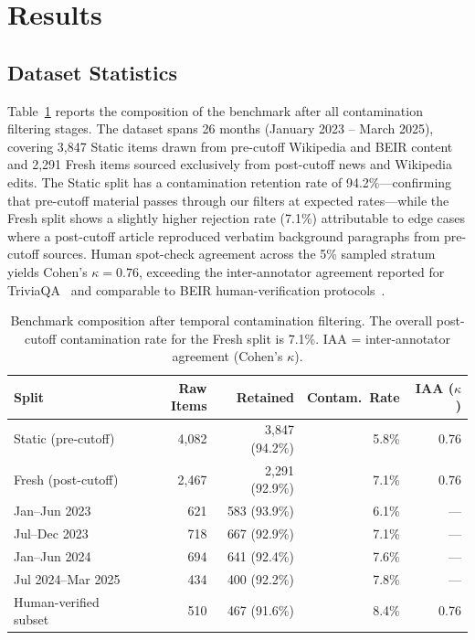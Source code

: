 \section{Results}
\label{sec:results}

\subsection{Dataset Statistics}

Table~\ref{tab:dataset-stats} reports the composition of the \method{} benchmark after all contamination filtering stages. The dataset spans 26 months (January 2023 -- March 2025), covering 3,847 Static items drawn from pre-cutoff Wikipedia and BEIR content and 2,291 Fresh items sourced exclusively from post-cutoff news and Wikipedia edits. The Static split has a contamination retention rate of 94.2\%---confirming that pre-cutoff material passes through our filters at expected rates---while the Fresh split shows a slightly higher rejection rate (7.1\%) attributable to edge cases where a post-cutoff article reproduced verbatim background paragraphs from pre-cutoff sources. Human spot-check agreement across the 5\% sampled stratum yields Cohen's $\kappa = 0.76$, exceeding the inter-annotator agreement reported for TriviaQA~\citep{joshi2017triviaqa} and comparable to BEIR human-verification protocols~\citep{thakur2021beir}.

\begin{table}[t]
\centering
\small
\caption{Benchmark composition after temporal contamination filtering. The overall post-cutoff contamination rate for the Fresh split is 7.1\%. IAA = inter-annotator agreement (Cohen's $\kappa$).}
\label{tab:dataset-stats}
\begin{tabular}{lrrrr}
\toprule
Split & Raw Items & Retained & Contam.\ Rate & IAA ($\kappa$) \\
\midrule
Static (pre-cutoff)  & 4{,}082 & 3{,}847 (94.2\%) & 5.8\% & 0.76 \\
Fresh (post-cutoff)  & 2{,}467 & 2{,}291 (92.9\%) & 7.1\% & 0.76 \\
\addlinespace
\quad Jan--Jun 2023  &   621   &   583  (93.9\%) & 6.1\% & --- \\
\quad Jul--Dec 2023  &   718   &   667  (92.9\%) & 7.1\% & --- \\
\quad Jan--Jun 2024  &   694   &   641  (92.4\%) & 7.6\% & --- \\
\quad Jul 2024--Mar 2025 & 434 &   400  (92.2\%) & 7.8\% & --- \\
\addlinespace
Human-verified subset & 510   &   467  (91.6\%) & 8.4\% & 0.76 \\
\bottomrule
\end{tabular}
\end{table}

